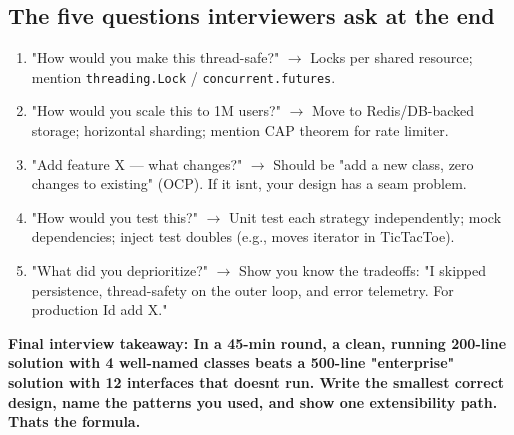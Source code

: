 \documentclass[11pt]{article}
\providecommand{\tightlist}{\setlength{\itemsep}{1pt}\setlength{\parskip}{0pt}}
\begin{document}
\subsection{The five questions interviewers ask at the end}\label{the-five-questions-interviewers-ask-at-the-end}

\begin{enumerate}
\def\labelenumi{\arabic{enumi}.}
\tightlist
\item
  "How would you make this thread-safe?" \(\rightarrow\) Locks per shared resource; mention \texttt{threading.Lock} / \texttt{concurrent.futures}.
\item
  "How would you scale this to 1M users?" \(\rightarrow\) Move to Redis/DB-backed storage; horizontal sharding; mention CAP theorem for rate limiter.
\item
  "Add feature X --- what changes?" \(\rightarrow\) Should be "add a new class, zero changes to existing" (OCP). If it isn\textquotesingle t, your design has a seam problem.
\item
  "How would you test this?" \(\rightarrow\) Unit test each strategy independently; mock dependencies; inject test doubles (e.g., moves iterator in TicTacToe).
\item
  "What did you deprioritize?" \(\rightarrow\) Show you know the tradeoffs: "I skipped persistence, thread-safety on the outer loop, and error telemetry. For production I\textquotesingle d add X."
\end{enumerate}

\textbf{Final interview takeaway: In a 45-min round, a clean, running 200-line solution with 4 well-named classes beats a 500-line "enterprise" solution with 12 interfaces that doesn\textquotesingle t run. Write the smallest correct design, name the patterns you used, and show one extensibility path. That\textquotesingle s the formula.}
\end{document}
